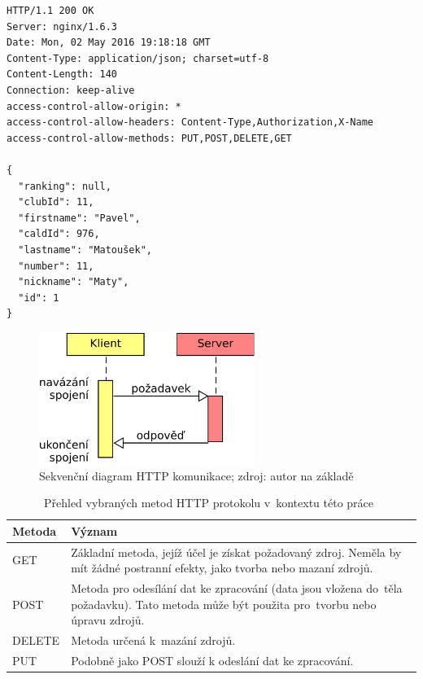 \begingroup
\fontsize{9.5pt}{11pt}\selectfont
\begin{verbatim}
HTTP/1.1 200 OK
Server: nginx/1.6.3
Date: Mon, 02 May 2016 19:18:18 GMT
Content-Type: application/json; charset=utf-8
Content-Length: 140
Connection: keep-alive
access-control-allow-origin: *
access-control-allow-headers: Content-Type,Authorization,X-Name
access-control-allow-methods: PUT,POST,DELETE,GET

{
  "ranking": null,
  "clubId": 11,
  "firstname": "Pavel",
  "caldId": 976,
  "lastname": "Matoušek",
  "number": 11,
  "nickname": "Maty",
  "id": 1
}
\end{verbatim}
\endgroup

\begin{figure}[ht!]
  \centering
  \includegraphics[width=70mm]{./images/http-komunikace.pdf}
  \caption{Sekvenční diagram HTTP komunikace; zdroj: autor na základě~\cite{rest_vse}\label{overflow}}
\end{figure}

\begin{table}[ht!]
  \centering
  \begin{tabular}{|l|p{10.1cm}|}
    \hline
    \textbf{Metoda} & \textbf{Význam}\\
    \hline
    GET & Základní metoda, jejíž účel je získat požadovaný zdroj. Neměla by mít žádné postranní efekty, jako tvorba nebo mazaní zdrojů.\\
    \hline
    POST & Metoda pro odesílání dat ke zpracování (data jsou vložena do~těla požadavku). Tato metoda může být použita pro~tvorbu nebo úpravu zdrojů.\\
    \hline
    DELETE & Metoda určená k~mazání zdrojů.\\
    \hline
    PUT & Podobně jako POST slouží k odeslání dat ke zpracování.\\
    \hline
  \end{tabular}
  \caption{Přehled vybraných metod HTTP protokolu v~kontextu této práce~\cite{http_metody}}
  \label{tab:http_metody}
\end{table}

